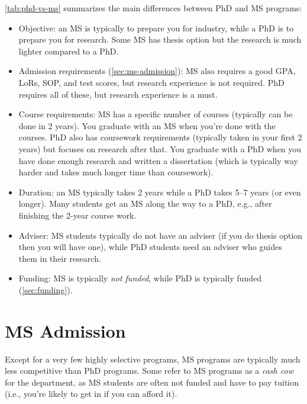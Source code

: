 \documentclass[oneside,11pt,dvipsnames]{book}
\begin{document}
\autoref{tab:phd-vs-ms} summarizes the main differences between PhD and MS programs:
\begin{itemize}

  \item Objective: an MS is typically to prepare you for industry, while a PhD is to prepare you for research. Some MS has thesis option but the research is much lighter compared to a PhD.

  \item Admission requirements (\autoref{sec:ms-admission}): MS also requires a good GPA, LoRs, SOP, and test scores, but research experience is not required.  PhD requires all of these, but research experience is a must.
  
  \item Course requirements: MS has a specific number of courses (typically can be done in 2 years). You graduate with an MS when you're done with the courses. PhD also has coursework requirements (typically taken in your first 2 years) but focuses on research after that.  You graduate with a PhD when you have done enough research and written a dissertation (which is typically way harder and takes much longer time than coursework).
  
  \item Duration: an MS typically takes 2 years while a PhD takes 5--7 years (or even longer).  Many students get an MS along the way to a PhD, e.g., after finishing the 2-year course work.
  
  \item Adviser: MS students typically do not have an adviser (if you do thesis option then you will have one), while PhD students need an adviser who guides them in their research.
  
  \item Funding: MS is typically \emph{not funded}, while PhD is typically funded (\autoref{sec:funding}).
  
\end{itemize}

\section{MS Admission}\label{sec:ms-admission}

Except for a very few highly selective programs, MS programs are typically much less competitive than PhD programs. Some refer to MS programs as a \emph{cash cow} for the department, as MS students are often not funded and have to pay tuition (i.e., you're likely to get in if you can afford it).
\end{document}
